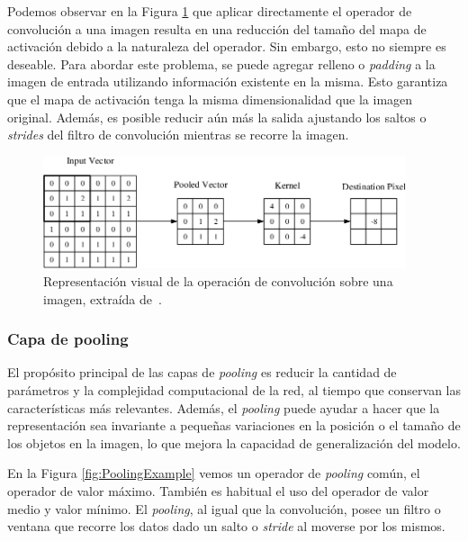 Podemos observar en la Figura \ref{fig:ConvolutionalRepresentation} que aplicar directamente 
el operador de convolución a una imagen resulta en una reducción del tamaño del mapa 
de activación debido a la naturaleza del operador. 
Sin embargo, esto no siempre es deseable. 
Para abordar este problema, se puede agregar relleno o \emph{padding} a la imagen 
de entrada utilizando información existente en la misma. 
Esto garantiza que el mapa de activación tenga la misma dimensionalidad que 
la imagen original. Además, es posible reducir aún más la salida ajustando 
los saltos o \emph{strides} del filtro de convolución mientras se recorre la imagen.

\begin{figure}[htp]
  \begin{center}
    \includegraphics[width=0.95\textwidth]{imagenes/chapter2/ConvolutionalRepresentation.png}
  \end{center}
  \caption[Representación visual de la operación de convolución]{Representación visual de la operación de convolución sobre una imagen, extraída de~\cite{ConvolutionalRepresentation}.
  }
  \label{fig:ConvolutionalRepresentation}
\end{figure}

\subsubsection{Capa de pooling} 
El propósito principal de las capas de \emph{pooling} es reducir la cantidad de parámetros 
y la complejidad computacional de la red, al tiempo que conservan las características 
más relevantes. Además, el \emph{pooling} puede ayudar a hacer que la representación sea 
invariante a pequeñas variaciones en la posición o el tamaño de los objetos en la 
imagen, lo que mejora la capacidad de generalización del modelo.

En la Figura \ref{fig:PoolingExample} vemos un operador de \emph{pooling} común,
el operador de valor máximo. También es habitual el uso del operador de valor medio y
valor mínimo.
El \emph{pooling}, al igual que la convolución, posee un filtro o ventana que recorre
los datos dado un salto o \emph{stride} al moverse por los mismos.

